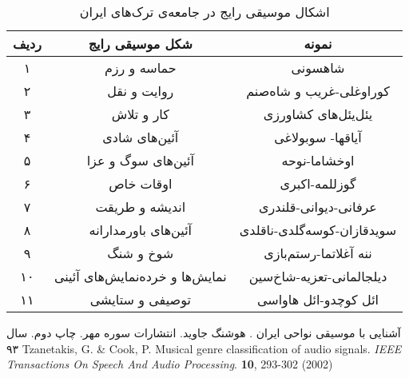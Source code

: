         
        \begin{table}[!h]
\centering
\begin{tabular}{|c|c|c|}
	\hline
    ردیف &  شکل موسیقی رایج &  نمونه\\
	\hline\hline
    ۱ & حماسه و رزم & شاهسونی \\
	\hline
    ۲ & روایت و نقل& کوراوغلی-غریب و شاه‌صنم \\
	\hline
	۳ & کار و تلاش & یئل‌یئل‌های کشاورزی
\\	\hline
	۴ &آئین‌های شادی  & آیاقها- سوبولاغی \\
	\hline
	۵ & آئین‌های سوگ و عزا & اوخشاما-نوحه \\
	\hline
	۶ & اوقات خاص & گوزللمه-اکبری \\
	\hline
	۷ & اندیشه و طریقت & عرفانی-دیوانی-قلندری  \\
	\hline
	۸ & آئین‌های باورمدارانه & سویدقازان-کوسه‌گلدی-ناقلدی\\
	\hline
	۹ &  شوخ و شنگ & ننه آغلاتما-رستم‌بازی\\
	\hline
	۱۰ & نمایش‌ها و خرده‌نمایش‌های آئینی & دیلجالمانی-تعزیه-شاخ‌سین  \\
	\hline
	۱۱ & توصیفی و ستایشی  & ائل کوچدو-ائل هاواسی  \\
	\hline
\end{tabular}
\caption{اشکال موسیقی رایج در جامعه‌ی ترک‌های ایران}
\label{t1}
\end{table}


\begin{thebibliography}{99}
	 آشنایی با موسیقی نواحی ایران . هوشنگ جاوید. انتشارات سوره مهر. چاپ دوم. سال ۹۳
	\resetlatinfont
	Tzanetakis, G. \& Cook, P. Musical genre classification of audio signals. {\em IEEE Transactions On Speech And Audio Processing}. \textbf{10}, 293-302 (2002)
\end{thebibliography}